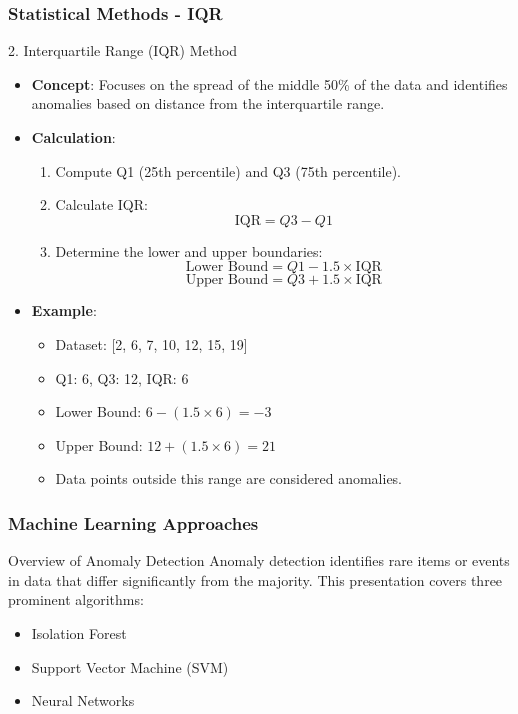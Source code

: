 \documentclass{beamer}
\begin{document}
\begin{frame}[fragile]
    \frametitle{Statistical Methods - IQR}
    \begin{block}{2. Interquartile Range (IQR) Method}
        \begin{itemize}
            \item \textbf{Concept}: Focuses on the spread of the middle 50\% of the data and identifies anomalies based on distance from the interquartile range.
            \item \textbf{Calculation}:
            \begin{enumerate}
                \item Compute Q1 (25th percentile) and Q3 (75th percentile).
                \item Calculate IQR:
                \begin{equation}
                \text{IQR} = Q3 - Q1
                \end{equation}
                \item Determine the lower and upper boundaries:
                \begin{equation}
                \text{Lower Bound} = Q1 - 1.5 \times \text{IQR}
                \end{equation}
                \begin{equation}
                \text{Upper Bound} = Q3 + 1.5 \times \text{IQR}
                \end{equation}
            \end{enumerate}
            \item \textbf{Example}:
            \begin{itemize}
                \item Dataset: [2, 6, 7, 10, 12, 15, 19]
                \item Q1: 6, Q3: 12, IQR: 6
                \item Lower Bound: $6 - (1.5 \times 6) = -3$
                \item Upper Bound: $12 + (1.5 \times 6) = 21$
                \item Data points outside this range are considered anomalies.
            \end{itemize}
        \end{itemize}
    \end{block}
\end{frame}

\begin{frame}[fragile]
    \frametitle{Machine Learning Approaches}
    \begin{block}{Overview of Anomaly Detection}
        Anomaly detection identifies rare items or events in data that differ significantly from the majority. This presentation covers three prominent algorithms:
        \begin{itemize}
            \item Isolation Forest
            \item Support Vector Machine (SVM)
            \item Neural Networks
        \end{itemize}
    \end{block}
\end{frame}
\end{document}
